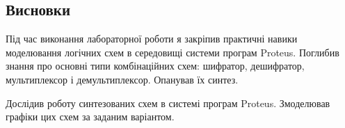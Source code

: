 \documentclass{article}
\begin{document}
\begin{normalsize}
	\section*{Висновки}
	Під час виконання лабораторної роботи я закріпив практичні навики моделювання логічних схем в середовищі системи програм Proteus. 
	Поглибив знання про основні типи комбінаційних схем: шифратор, дешифратор, мультиплексор і демультиплексор. Опанував їх синтез. 
	
	Дослідив роботу синтезованих схем в системі програм Proteus. Змоделював графіки цих схем за заданим варіантом.
	    
\end{normalsize}
\end{document}
